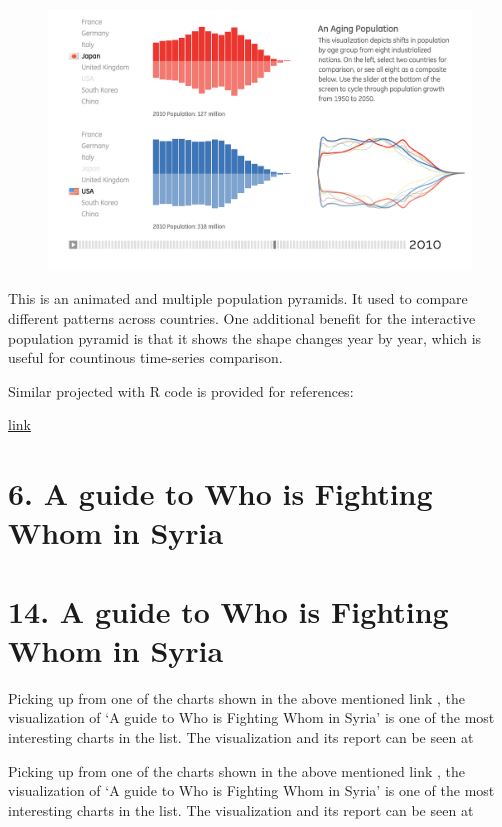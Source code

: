 \documentclass[]{book}
\theoremstyle{definition}
\theoremstyle{definition}
\theoremstyle{definition}
\theoremstyle{remark}
\begin{document}
\begin{figure}
\centering
\includegraphics{images/3_1.png}
\caption{}
\end{figure}

This is an animated and multiple population pyramids. It used to compare
different patterns across countries. One additional benefit for the
interactive population pyramid is that it shows the shape changes year
by year, which is useful for countinous time-series comparison.

Similar projected with R code is provided for references:

\href{https://www.r-bloggers.com/who-is-old-visualizing-the-concept-of-prospective-ageing-with-animated-population-pyramids/}{link}

\section{6. A guide to Who is Fighting Whom in
Syria}\label{a-guide-to-who-is-fighting-whom-in-syria}

\section{14. A guide to Who is Fighting Whom in
Syria}\label{a-guide-to-who-is-fighting-whom-in-syria-1}

Picking up from one of the charts shown in the above mentioned link
\citep{int_viz_1}, the visualization of `A guide to Who is Fighting Whom
in Syria' is one of the most interesting charts in the list. The
visualization and its report can be seen at \citep{syria_chart}

Picking up from one of the charts shown in the above mentioned link
\citep{int_viz_1}, the visualization of `A guide to Who is Fighting Whom
in Syria' is one of the most interesting charts in the list. The
visualization and its report can be seen at
\end{document}

